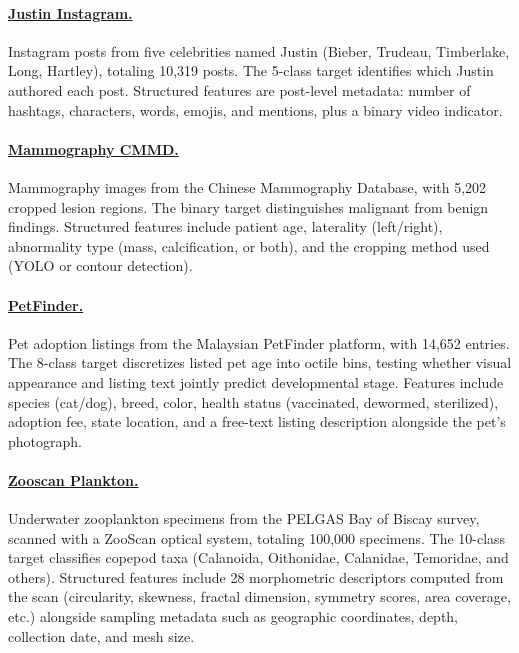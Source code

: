 \paragraph{\href{https://www.kaggle.com/datasets/aldiandyainf/which-justin-posted-that}{Justin Instagram.}} Instagram posts from five celebrities named Justin (Bieber, Trudeau, Timberlake, Long, Hartley), totaling 10,319 posts. The 5-class target identifies which Justin authored each post.
Structured features are post-level metadata: number of hashtags, characters, words, emojis, and mentions, plus a binary video indicator.

\paragraph{\href{https://www.kaggle.com/datasets/nguynththanhho/cmmd-mammography}{Mammography CMMD.}} Mammography images from the Chinese Mammography Database, with 5,202 cropped lesion regions.
The binary target distinguishes malignant from benign findings.
Structured features include patient age, laterality (left/right), abnormality type (mass, calcification, or both), and the cropping method used (YOLO or contour detection).

\paragraph{\href{https://www.kaggle.com/datasets/c/petfinder-adoption-prediction}{PetFinder.}} Pet adoption listings from the Malaysian PetFinder platform, with 14,652 entries.
The 8-class target discretizes listed pet age into octile bins, testing whether visual appearance and listing text jointly predict developmental stage.
Features include species (cat/dog), breed, color, health status (vaccinated, dewormed, sterilized), adoption fee, state location, and a free-text listing description alongside the pet's photograph.

\paragraph{\href{https://www.kaggle.com/datasets/raghavdharwal/pelgass-bay-of-biscay-zooscan-zooplankton-dataset}{Zooscan Plankton.}} Underwater zooplankton specimens from the PELGAS Bay of Biscay survey, scanned with a ZooScan optical system, totaling 100,000 specimens.
The 10-class target classifies copepod taxa (Calanoida, Oithonidae, Calanidae, Temoridae, and others).
Structured features include 28 morphometric descriptors computed from the scan (circularity, skewness, fractal dimension, symmetry scores, area coverage, etc.) alongside sampling metadata such as geographic coordinates, depth, collection date, and mesh size.

